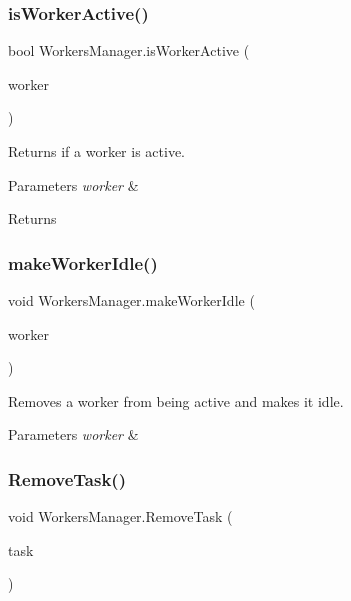 \subsubsection{\texorpdfstring{is\+Worker\+Active()}{isWorkerActive()}}
{\footnotesize\ttfamily bool Workers\+Manager.\+is\+Worker\+Active (\begin{DoxyParamCaption}\item[{\mbox{\hyperlink{class_worker}{Worker}}}]{worker }\end{DoxyParamCaption})}



Returns if a worker is active. 


\begin{DoxyParams}{Parameters}
{\em worker} & \\
\hline
\end{DoxyParams}
\begin{DoxyReturn}{Returns}

\end{DoxyReturn}
\mbox{\label{class_workers_manager_a5e3d8d9573ed24b8ff2b8d2e1330ca63}} 
\subsubsection{\texorpdfstring{make\+Worker\+Idle()}{makeWorkerIdle()}}
{\footnotesize\ttfamily void Workers\+Manager.\+make\+Worker\+Idle (\begin{DoxyParamCaption}\item[{\mbox{\hyperlink{class_worker}{Worker}}}]{worker }\end{DoxyParamCaption})}



Removes a worker from being active and makes it idle. 


\begin{DoxyParams}{Parameters}
{\em worker} & \\
\hline
\end{DoxyParams}
\mbox{\label{class_workers_manager_aae249c0ee119a7cfc94a45cea76bfcfc}} 
\subsubsection{\texorpdfstring{Remove\+Task()}{RemoveTask()}}
{\footnotesize\ttfamily void Workers\+Manager.\+Remove\+Task (\begin{DoxyParamCaption}\item[{Game\+Object}]{task }\end{DoxyParamCaption})}



